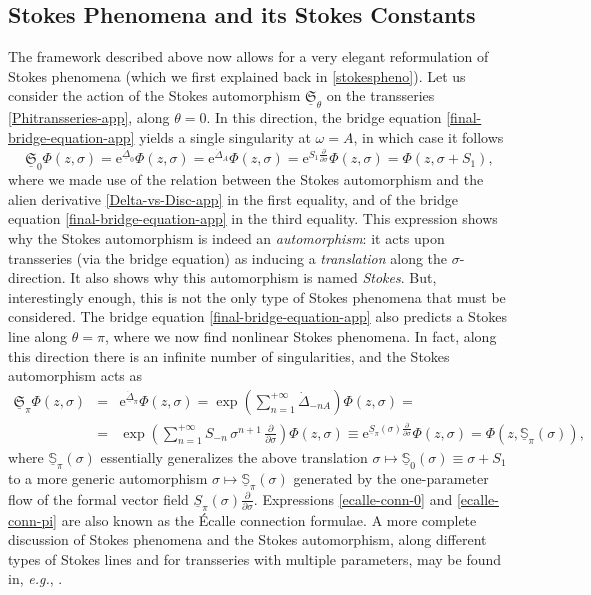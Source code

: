 \documentclass[11pt,a4paper]{article}
\def\BS{{\mathbb S}}
\newcommand{\be}{\begin{equation}}
\newcommand{\ee}{\end{equation}}
\newcommand{\bea}{\begin{eqnarray}}
\newcommand{\eea}{\end{eqnarray}}
\newcommand{\rme}{{\mathrm{e}}}
\begin{document}
\subsection*{Stokes Phenomena and its Stokes Constants}

The framework described above now allows for a very elegant reformulation of Stokes phenomena (which we first explained back in \eqref{stokespheno}). Let us consider the action of the Stokes automorphism $\underline{\mathfrak{S}}_\theta$ on the transseries \eqref{Phitransseries-app}, along $\theta=0$. In this direction, the bridge equation \eqref{final-bridge-equation-app} yields a single singularity at $\omega = A$, in which case it follows
%
\be
\label{ecalle-conn-0}
\underline{\mathfrak{S}}_0 \Phi (z,\sigma) = \rme^{\dot{\underline{\Delta}}_0} \Phi (z,\sigma) = \rme^{\dot{\Delta}_A} \Phi (z,\sigma) = \rme^{S_1 \frac{\partial}{\partial\sigma}} \Phi (z,\sigma) = \Phi (z, \sigma+S_1 ),
\ee
%
\noindent
where we made use of the relation between the Stokes automorphism and the alien derivative \eqref{Delta-vs-Disc-app} in the first equality, and of the bridge equation \eqref{final-bridge-equation-app} in the third equality. This expression shows why the Stokes automorphism is indeed an \textit{automorphism}: it acts upon transseries (via the bridge equation) as inducing a \textit{translation} along the $\sigma$-direction. It also shows why this automorphism is named \textit{Stokes}. But, interestingly enough, this is not the only type of Stokes phenomena that must be considered. The bridge equation \eqref{final-bridge-equation-app} also predicts a Stokes line along $\theta=\pi$, where we now find nonlinear Stokes phenomena. In fact, along this direction there is an infinite number of singularities, and the Stokes automorphism acts as
%
\bea
\underline{\mathfrak{S}}_\pi \Phi (z,\sigma) &=& \rme^{\dot{\underline{\Delta}}_\pi} \Phi (z,\sigma) = \exp \left( \sum_{n=1}^{+\infty} \dot{\Delta}_{- n A} \right) \Phi (z,\sigma) = \\
&=& \exp \left( \sum_{n=1}^{+\infty} S_{-n}\, \sigma^{n+1}\, \frac{\partial}{\partial\sigma} \right) \Phi (z,\sigma) \equiv \rme^{\underline{S}_\pi (\sigma) \frac{\partial}{\partial\sigma}} \Phi (z,\sigma) = \Phi (z, \underline{\BS}_\pi (\sigma) ),
\label{ecalle-conn-pi}
\eea
%
\noindent
where $\underline{\BS}_\pi (\sigma)$ essentially generalizes the above translation $\sigma \mapsto \underline{\BS}_0 (\sigma) \equiv \sigma + S_1$ to a more generic automorphism $\sigma \mapsto \underline{\BS}_\pi (\sigma)$ generated by the one-parameter flow of the formal vector field $\underline{S}_\pi (\sigma) \frac{\partial}{\partial\sigma}$. Expressions \eqref{ecalle-conn-0} and \eqref{ecalle-conn-pi} are also known as the \'Ecalle connection formulae. A more complete discussion of Stokes phenomena and the Stokes automorphism, along different types of Stokes lines and for transseries with multiple parameters, may be found in, \textit{e.g.}, \cite{as13}.
\end{document}
